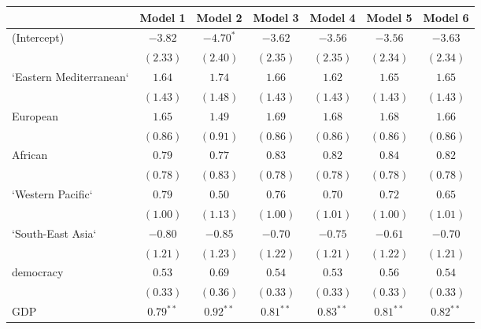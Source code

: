
\begin{table}[!h]
\begin{center}
\begin{tabular}{l c c c c c c }
\toprule
 & Model 1 & Model 2 & Model 3 & Model 4 & Model 5 & Model 6 \\
\midrule
(Intercept)             & $-3.82$      & $-4.70^{*}$  & $-3.62$      & $-3.56$      & $-3.56$      & $-3.63$      \\
                        & $(2.33)$     & $(2.40)$     & $(2.35)$     & $(2.35)$     & $(2.34)$     & $(2.34)$     \\
`Eastern Mediterranean` & $1.64$       & $1.74$       & $1.66$       & $1.62$       & $1.65$       & $1.65$       \\
                        & $(1.43)$     & $(1.48)$     & $(1.43)$     & $(1.43)$     & $(1.43)$     & $(1.43)$     \\
European                & $1.65$       & $1.49$       & $1.69$       & $1.68$       & $1.68$       & $1.66$       \\
                        & $(0.86)$     & $(0.91)$     & $(0.86)$     & $(0.86)$     & $(0.86)$     & $(0.86)$     \\
African                 & $0.79$       & $0.77$       & $0.83$       & $0.82$       & $0.84$       & $0.82$       \\
                        & $(0.78)$     & $(0.83)$     & $(0.78)$     & $(0.78)$     & $(0.78)$     & $(0.78)$     \\
`Western Pacific`       & $0.79$       & $0.50$       & $0.76$       & $0.70$       & $0.72$       & $0.65$       \\
                        & $(1.00)$     & $(1.13)$     & $(1.00)$     & $(1.01)$     & $(1.00)$     & $(1.01)$     \\
`South-East Asia`       & $-0.80$      & $-0.85$      & $-0.70$      & $-0.75$      & $-0.61$      & $-0.70$      \\
                        & $(1.21)$     & $(1.23)$     & $(1.22)$     & $(1.21)$     & $(1.22)$     & $(1.21)$     \\
democracy               & $0.53$       & $0.69$       & $0.54$       & $0.53$       & $0.56$       & $0.54$       \\
                        & $(0.33)$     & $(0.36)$     & $(0.33)$     & $(0.33)$     & $(0.33)$     & $(0.33)$     \\
GDP                     & $0.79^{**}$  & $0.92^{**}$  & $0.81^{**}$  & $0.83^{**}$  & $0.81^{**}$  & $0.82^{**}$  \\

\end{tabular}
\end{center}
\end{table}
